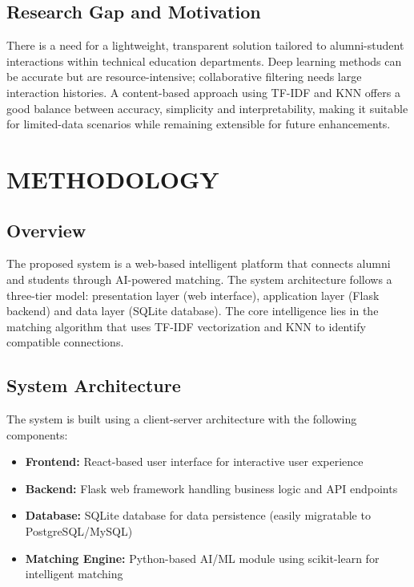 \documentclass[12pt,a4paper]{report}
\let\origsection\section
\renewcommand{\section}{\needspace{4\baselineskip}\origsection}
\begin{document}
\section{Research Gap and Motivation}

There is a need for a lightweight, transparent solution tailored to alumni-student interactions within technical education departments. Deep learning methods can be accurate but are resource-intensive; collaborative filtering needs large interaction histories. A content-based approach using TF-IDF and KNN offers a good balance between accuracy, simplicity and interpretability, making it suitable for limited-data scenarios while remaining extensible for future enhancements.


\chapter{METHODOLOGY}
\thispagestyle{fancy}

\section{Overview}

The proposed system is a web-based intelligent platform that connects alumni and students through AI-powered matching. The system architecture follows a three-tier model: presentation layer (web interface), application layer (Flask backend) and data layer (SQLite database). The core intelligence lies in the matching algorithm that uses TF-IDF vectorization and KNN to identify compatible connections.

\section{System Architecture}

The system is built using a client-server architecture with the following components:

\begin{itemize}[noitemsep]
    \item \textbf{Frontend:} React-based user interface for interactive user experience
    \item \textbf{Backend:} Flask web framework handling business logic and API endpoints
    \item \textbf{Database:} SQLite database for data persistence (easily migratable to PostgreSQL/MySQL)
    \item \textbf{Matching Engine:} Python-based AI/ML module using scikit-learn for intelligent matching
\end{itemize}
\end{document}
